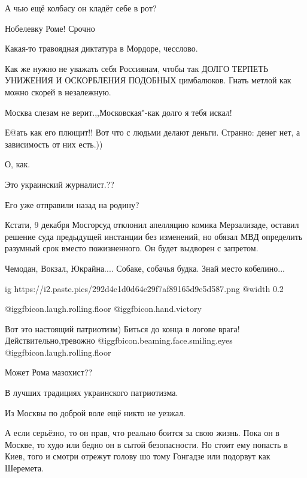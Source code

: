 \begin{itemize}
А чью ещё колбасу он кладёт себе в рот?

Нобелевку Роме! Срочно

Какая-то травоядная диктатура в Мордоре, чесслово.


Как же нужно не уважать себя Россиянам, чтобы так ДОЛГО ТЕРПЕТЬ УНИЖЕНИЯ И
ОСКОРБЛЕНИЯ ПОДОБНЫХ цимбалюков. Гнать метлой как можно скорей в незалежную.


Москва слезам не верит.,,Московская"-как долго я тебя искал!

Е@ать как его плющит!! Вот что с людьми делают деньги. Странно: денег нет, а зависимость от них есть.))

О, как.

Это украинский журналист.??

Его уже отправили назад на родину?


Кстати, 9 декабря Мосгорсуд отклонил апелляцию комика Мерзализаде, оставил
решение суда предыдущей инстанции без изменений, но обязал МВД определить
разумный срок вместо пожизненного. Он будет выдворен с запретом.

Чемодан, Вокзал, Юкрайна....
Собаке, собачья будка.
Знай место кобелино...


\ifcmt
  ig https://i2.paste.pics/292d4e1d0d64e29f7af89165d9e5d587.png
  @width 0.2
\fi

 @igg{fbicon.laugh.rolling.floor} @igg{fbicon.hand.victory}


Вот это настоящий патриотизм) Биться до конца в логове врага!
Действительно,тревожно @igg{fbicon.beaming.face.smiling.eyes}
@igg{fbicon.laugh.rolling.floor} 

Может Рома мазохист??

В лучших традициях украинского патриотизма.

Из Москвы по доброй воле ещё никто не уезжал.


А если серьёзно, то он прав, что реально боится за свою жизнь. Пока он в
Москве, то худо или бедно он в сытой безопасности. Но стоит ему попасть в Киев,
того и смотри отрежут голову шо тому Гонгадзе или подорвут как Шеремета.


\end{itemize}
